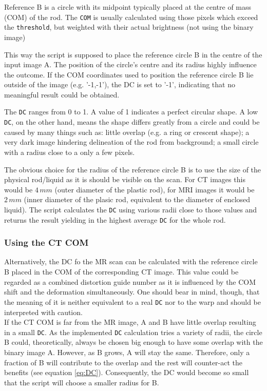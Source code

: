 Reference B is a circle with its midpoint typically placed at the centre of mass (COM) of the rod.
The \texttt{COM} is usually calculated using those pixels which exceed the \texttt{threshold}, but weighted with their actual brightness (not using the binary image)

This way the script is supposed to place the reference circle B in the centre of the input image A.
The position of the circle's centre and its radius highly influence the outcome.
If the COM coordinates used to position the reference circle B lie outside of the image (e.g. '-1,-1'), the DC is set to '-1', indicating that no meaningful result could be obtained.

The \texttt{DC} ranges from 0 to 1.
A value of 1 indicates a perfect circular shape.
A low \texttt{DC}, on the other hand, means the shape differs greatly from a circle and could be caused by many things such as:
little overlap (e.g. a ring or crescent shape); a very dark image hindering delineation of the rod from background; a small circle with a radius close to a only a few pixels.

The obvious choice for the radius of the reference circle B is to use the size of the physical rod/liquid as it is should be visible on the scan.
For CT images this would be $4\,mm$ (outer diameter of the plastic rod), for MRI images it would be $2\,mm$ (inner diameter of the plasic rod, equivalent to the diameter of enclosed liquid).
The script calculates the \texttt{DC} using various radii close to those values and returns the result yielding in the highest average \texttt{DC} for the whole rod.

\subsubsection{Using the CT COM}
Alternatively, the DC fo the MR scan can be calculated with the reference circle B placed in the COM of the corresponding CT image.
This value could be regarded as a combined distortion guide number as it is influenced by the COM shift and the deformation simultaneously.
One should bear in mind, though, that the meaning of it is neither equivalent to a real \texttt{DC} nor to the warp and should be interpreted with caution.\\

If the CT COM is far from the MR image, A and B have little overlap resulting in a small \texttt{DC}.
As the implemented \texttt{DC} calculation tries a variety of radii, the circle B could, theoretically, always be chosen big enough to have some overlap with the binary image A.
However, as B grows, A will stay the same.
Therefore, only a fraction of B will contribute to the overlap and the rest will counter-act the benefits (see equation \ref{eq:DC}).
Consequently, the DC would become so small that the script will choose a smaller radius for B.

